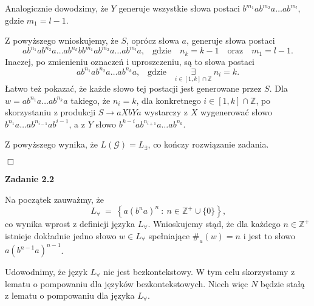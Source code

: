 \documentclass[12pt]{article}
\begin{document}
	\medskip
	
	Analogicznie dowodzimy, że \(Y\) generuje wszystkie słowa postaci
	\(b^{m_{1}} a b^{m_{2}} a \ldots a b^{m_{l}}\), gdzie \(m_{1} = l - 1\).
	
	\medskip
	
	Z powyższego wnioskujemy, że \(S\), oprócz słowa \(a\), generuje słowa
	postaci
	\[ a b^{n_{1}} a b^{n_{2}} a \ldots a b^{n_{k}} b b^{m_{1}} a b^{m_{2}} a
	\ldots a b^{m_{l}} a \text{,} \quad \text{gdzie} \quad n_{k} = k - 1 \quad
	\text{oraz} \quad m_{1} = l - 1 \text{.} \]
	Inaczej, po zmienieniu oznaczeń i uproszczeniu, są to słowa postaci
	\[ a b^{n_{1}} a b^{n_{2}}a \ldots a b^{n_{k}} a \text{,} \quad \text{gdzie}
	\quad \underset{i \in \left[ 1, k \right] \cap \mathbb{Z}}{\exists} \ n_{i}
	= k \text{.} \]
	Łatwo też pokazać, że każde słowo tej postacji jest generowane przez \(S\).
	Dla \(w = a b^{n_{1}} a \ldots a b^{n_{k}} a\) takiego, że \(n_{i} = k\),
	dla konkretnego \(i \in \left[ 1, k \right] \cap \mathbb{Z}\), po
	skorzystaniu z produkcji \(S \longrightarrow aXbYa\) wystarczy z \(X\)
	wygenerować słowo \(b^{n_{1}} a \ldots a b^{n_{i - 1}} a b^{i - 1}\), a z
	\(Y\) słowo \(b^{k - i} a b^{n_{i + 1}} a \ldots a b^{n_{k}}\).
	
	\medskip
	
	Z powyższego wynika, że \(L \left( \mathcal{G} \right) = L_{\exists}\), co
	kończy rozwiązanie zadania.
	\begin{flushright}
		\(\Box\)
	\end{flushright}
	
	\newpage
	
	\textbf{Zadanie 2.2}
	
	\medskip
	
	Na początek zauważmy, że
	\[ L_{\forall} \ = \ \left\{ a \left( b^{n} a \right) ^ {n} \ : \ n \in
	\mathbb{Z}^{+} \cup \{0\} \right\} \text{,} \]
	co wynika wprost z definicji języka \(L_{\forall}\). Wnioskujemy stąd, że
	dla każdego \(n \in \mathbb{Z}^{+}\) istnieje dokładnie jedno słowo \(w \in
	L_{\forall}\) spełniające \(\#_{a} \left( w \right) = n\) i jest to słowo
	\(a \left( b^{n - 1} a \right) ^ {n - 1}\).
	
	\medskip
	
	Udowodnimy, że język \(L_{\forall}\) nie jest bezkontekstowy. W tym celu
	skorzystamy z lematu o pompowaniu dla języków bezkontekstowych. Niech
	więc \(N\) będzie stałą z lematu o pompowaniu dla języka \(L_{\forall}\).
	
	\medskip
	
\end{document}
